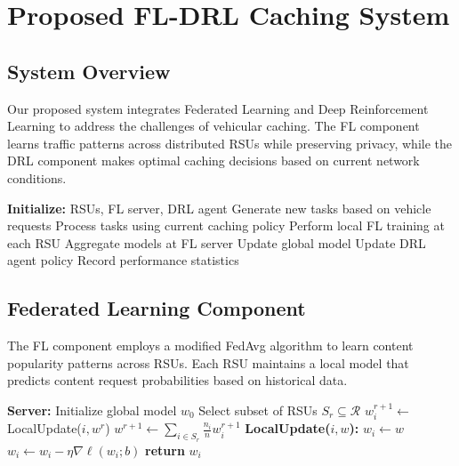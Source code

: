 \documentclass[conference]{IEEEtran}
\begin{document}
\section{Proposed FL-DRL Caching System}

\subsection{System Overview}

Our proposed system integrates Federated Learning and Deep Reinforcement Learning to address the challenges of vehicular caching. The FL component learns traffic patterns across distributed RSUs while preserving privacy, while the DRL component makes optimal caching decisions based on current network conditions.

\begin{algorithm}
\caption{Main System Algorithm}
\label{alg:main}
\begin{algorithmic}[1]
\State \textbf{Initialize:} RSUs, FL server, DRL agent
    \State Generate new tasks based on vehicle requests
    \State Process tasks using current caching policy
        \State Perform local FL training at each RSU
    \EndIf
        \State Aggregate models at FL server
        \State Update global model
    \EndIf
        \State Update DRL agent policy
    \EndIf
        \State Record performance statistics
    \EndIf
\EndFor
\end{algorithmic}
\end{algorithm}

\subsection{Federated Learning Component}

The FL component employs a modified FedAvg algorithm to learn content popularity patterns across RSUs. Each RSU maintains a local model that predicts content request probabilities based on historical data.

\begin{algorithm}
\caption{Federated Learning Algorithm}
\label{alg:fedavg}
\begin{algorithmic}[1]
\State \textbf{Server:}
\State Initialize global model $w_0$
    \State Select subset of RSUs $S_r \subseteq \mathcal{R}$
        \State $w_i^{r+1} \leftarrow$ LocalUpdate($i, w^r$)
    \EndFor
    \State $w^{r+1} \leftarrow \sum_{i \in S_r} \frac{n_i}{n} w_i^{r+1}$
\EndFor
\State \textbf{LocalUpdate($i, w$):}
\State $w_i \leftarrow w$
        \State $w_i \leftarrow w_i - \eta \nabla \ell(w_i; b)$
    \EndFor
\EndFor
\State \textbf{return} $w_i$
\end{algorithmic}
\end{algorithm}
\end{document}
